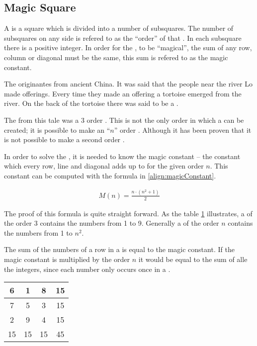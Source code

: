 \subsection{Magic Square}
\label{sec:magicSquare}
A \msquare{} is a square which is divided into a number of subsquares. The number of subsquares on any side is refered to as the ``order'' of that \msquare{}. In each subsquare there is a positive integer. In order for the \msquare{}, to be ``magical'', the sum of any row, column or diagonal must be the same, this sum is refered to as the magic constant.

The \msquare{}\cite{aiden06} originantes from ancient China. It was said that the people near the river Lo made offerings. Every time they made an offering a tortoise emerged from the river. On the back of the tortoise there was said to be a \msquare{}.

The \msquare{} from this tale was a 3 order \msquare{}. This is not the only order in which a \msquare{} can be created; it is possible to make an ``$n$'' order \msquare{}. Although it has been proven that it is not possible to make a second order \msquare{}.

In order to solve the \msquare{}, it is needed to know the magic constant -- the constant which every row, line and diagonal adds up to for the given order $n$. This constant can be computed with the formula in \ref{align:magicConstant}.

\begin{align}
\label{align:magicConstant}
	M(n) = \frac{n \cdot (n^2+1)}{2}
\end{align}

The proof of this formula is quite straight forward. As the table \ref{tab:magicSquareOrder3} illustrates, a \msquare{} of the order 3 contains the numbers from 1 to 9. Generally a \msquare{} of the order $n$ contains the numbers from 1 to $n^2$.

The sum of the numbers of a row in a \msquare{} is equal to the magic constant. If the magic constant is multiplied by the order $n$ it would be equal to the sum of alle the integers, since each number only occurs once in a \msquare{}.

\renewcommand{\arraystretch}{1.3}
\begin{table}[h]
	\centering
		\begin{tabular}{|c|c|c |@{\vrules}| c|}
			\hline
			6&1&8&15 \\
			\hline
			7&5&3&15 \\
			\hline
			2&9&4&15 \\
			\noalign{\hrules}
			15&15&15&45 \\
			\hline
		\end{tabular}
	\label{tab:magicSquareOrder3}
\end{table}

